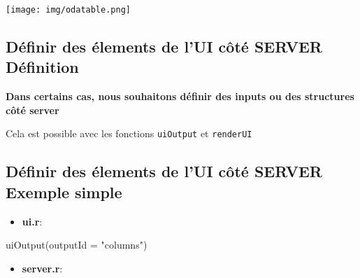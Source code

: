 \documentclass[
]{article}
\newenvironment{Shaded}{\begin{snugshade}}{\end{snugshade}}
\newcommand{\AttributeTok}[1]{\textcolor[rgb]{0.77,0.63,0.00}{#1}}
\newcommand{\FunctionTok}[1]{\textcolor[rgb]{0.00,0.00,0.00}{#1}}
\newcommand{\NormalTok}[1]{#1}
\newcommand{\OtherTok}[1]{\textcolor[rgb]{0.56,0.35,0.01}{#1}}
\newcommand{\SpecialCharTok}[1]{\textcolor[rgb]{0.00,0.00,0.00}{#1}}
\newcommand{\StringTok}[1]{\textcolor[rgb]{0.31,0.60,0.02}{#1}}
\providecommand{\tightlist}{%
  \setlength{\itemsep}{0pt}\setlength{\parskip}{0pt}}
\begin{document}
\begin{Shaded}
\end{Shaded}

\texttt{[image: img/odatable.png]}

\hypertarget{duxe9finir-des-uxe9lements-de-lui-cuxf4tuxe9-server-duxe9finition}{%
\subsection{Définir des élements de l'UI côté SERVER \textbar{}
Définition}\label{duxe9finir-des-uxe9lements-de-lui-cuxf4tuxe9-server-duxe9finition}}

\textbf{Dans certains cas, nous souhaitons définir des inputs ou des
structures côté server}

Cela est possible avec les fonctions \texttt{uiOutput} et
\texttt{renderUI}

\hypertarget{duxe9finir-des-uxe9lements-de-lui-cuxf4tuxe9-server-exemple-simple}{%
\subsection{Définir des élements de l'UI côté SERVER \textbar{} Exemple
simple}\label{duxe9finir-des-uxe9lements-de-lui-cuxf4tuxe9-server-exemple-simple}}

\begin{itemize}
\tightlist
\item
  \textbf{ui.r}:
\end{itemize}

\begin{Shaded}
\begin{Highlighting}[]
\FunctionTok{uiOutput}\NormalTok{(}\AttributeTok{outputId =} \StringTok{"columns"}\NormalTok{)}
\end{Highlighting}
\end{Shaded}

\begin{itemize}
\tightlist
\item
  \textbf{server.r}:
\end{itemize}

\begin{Shaded}
\end{Shaded}
\end{document}

